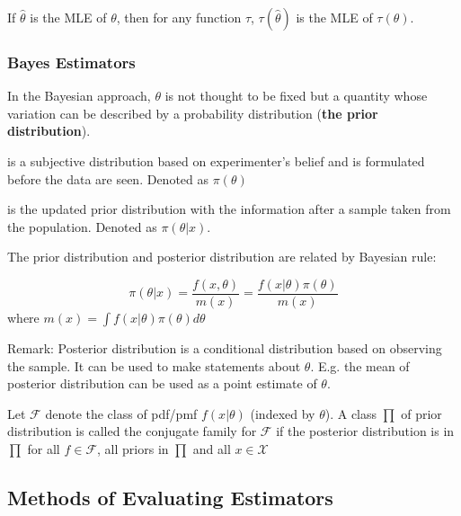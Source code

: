 \documentclass[12pt]{article}
\begin{document}
\begin{theorem}
	If $\hat{\theta}$ is the MLE of $\theta$, then for any function $\tau$, $\tau(\hat{\theta})$ is the MLE of $\tau(\theta)$.
\end{theorem}

\subsubsection*{Bayes Estimators}
In the Bayesian approach, $\theta$ is not thought to be fixed but a quantity whose variation can be described by a probability distribution (\textbf{the prior distribution}).

\begin{definition}
	is a subjective distribution based on experimenter's belief and is formulated before the data are seen. Denoted as $\pi(\theta)$
\end{definition}

\begin{definition} is the updated prior distribution with the information after a sample taken from the population. Denoted as $\pi(\theta | x)$.
\end{definition}

The prior distribution and posterior distribution are related by Bayesian rule:

$$
  \pi(\theta|x) = \frac{f(x, \theta)}{m(x)} =  \frac{f(x|\theta) \pi(\theta)} {m(x)} 
$$
where $m(x) = \int f(x|\theta)\pi(\theta) d\theta$

Remark: Posterior distribution is a conditional distribution based on observing the sample. It can be used to make statements about $\theta$. E.g. the mean of posterior distribution can be used as a point estimate of $\theta$.

\begin{definition}
	Let $\mathcal{F}$ denote the class of pdf/pmf $f(x|\theta)$ (indexed by $\theta$). A class $\prod$ of prior distribution is called the conjugate family for $\mathcal{F}$ if the posterior distribution is in $\prod$ for all $f \in \mathcal{F}$, all priors in $\prod$ and all $x \in \mathcal{X}$
\end{definition}

\subsection*{Methods of Evaluating Estimators}
\end{document}
